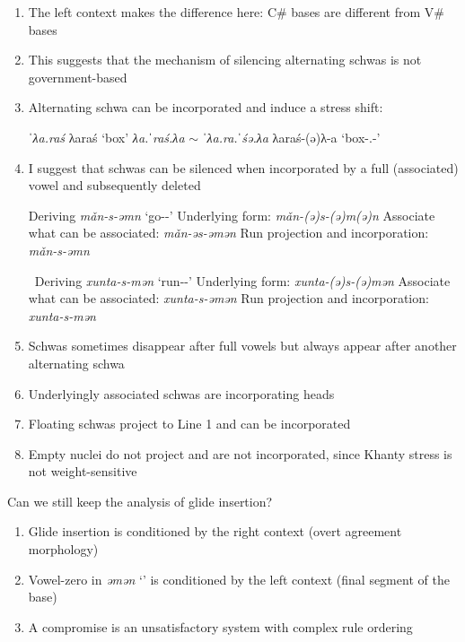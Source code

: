 \documentclass[a4paper, 12pt]{article}
\begin{document}
	\begin{enumerate}[$\gg$]
		\item The left context makes the difference here: C\# bases are different from V\# bases
		\item This suggests that the mechanism of silencing alternating schwas is not government-based
		\item Alternating schwa can be incorporated and induce a stress shift:
		
		\pex
			\a \emph{ˈλa.raś} \hfill λaraś `box'
			\a \emph{λa.ˈraś.λa} $\sim$ \emph{ˈλa.ra.ˈśə.λa} \hfill λaraś-(ə)λ-a `box-{\Poss}.{\Tsg}-{\Dat}'
		\xe
		
		\item I suggest that schwas can be silenced when incorporated by a full (associated) vowel and subsequently deleted
		
	\pex Deriving \emph{mǎn-s-əmn} `go-{\Pst}-{\Fdu}'
		\a Underlying form: \emph{mǎn-(ə)s-(ə)m(ə)n}
		\a Associate what can be associated: \emph{mǎn-əs-əmən}
		\a Run projection and incorporation: \emph{mǎn-s-əmn}
	\xe
	
	\pex~Deriving \emph{xunta-s-mən} `run-{\Pst}-{\Fdu}'
		\a Underlying form: \emph{xunta-(ə)s-(ə)mən}
		\a Associate what can be associated: \emph{xunta-s-əmən}
		\a Run projection and incorporation: \emph{xunta-s-mən}
	\xe
		
		\item Schwas sometimes disappear after full vowels but always appear after another alternating schwa
		\item Underlyingly associated schwas are incorporating heads
		\item Floating schwas project to Line 1 and can be incorporated
		\item Empty nuclei do not project and are not incorporated, since Khanty stress is not weight-sensitive
	\end{enumerate}
	Can we still keep the analysis of glide insertion?
	
	\begin{enumerate}[$\gg$]
		\item Glide insertion is conditioned by the right context (overt agreement morphology)
		\item Vowel-zero in \emph{əmən} `{\Fdu}' is conditioned by the left context (final segment of the base)
		\item A compromise is an unsatisfactory system with complex rule ordering
	\end{enumerate}
	
\end{document}
